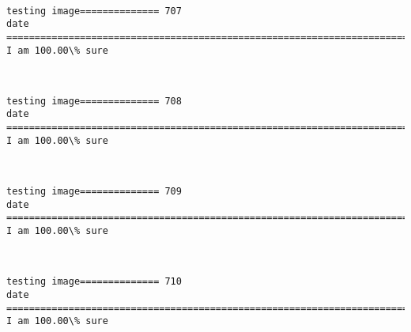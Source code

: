 \documentclass[11pt]{article}
\begin{document}
    \begin{center}
    \end{center}
    { \hspace*{\fill} \\}
    
    \begin{Verbatim}[commandchars=\\\{\}]
testing image============== 707
date
============================================================================
I am 100.00\% sure

    \end{Verbatim}

    \begin{center}
    \end{center}
    { \hspace*{\fill} \\}
    
    \begin{Verbatim}[commandchars=\\\{\}]
testing image============== 708
date
============================================================================
I am 100.00\% sure

    \end{Verbatim}

    \begin{center}
    \end{center}
    { \hspace*{\fill} \\}
    
    \begin{Verbatim}[commandchars=\\\{\}]
testing image============== 709
date
============================================================================
I am 100.00\% sure

    \end{Verbatim}

    \begin{center}
    \end{center}
    { \hspace*{\fill} \\}
    
    \begin{Verbatim}[commandchars=\\\{\}]
testing image============== 710
date
============================================================================
I am 100.00\% sure

    \end{Verbatim}
\end{document}
